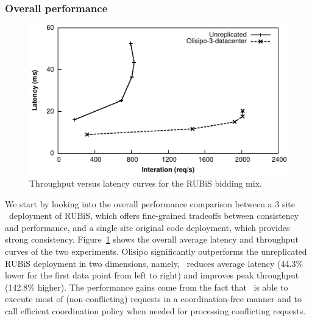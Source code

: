 \subsubsection{Overall performance}
\begin{figure}[t!]
  \centering
\includegraphics[width=0.85\columnwidth]{figures/por/eval/throughput_unreplicated_vs_por.pdf}
  \caption{Throughput versus latency curves for the RUBiS bidding mix.}
 \label{fig:por:thptunreplicatevspor}
\end{figure}

We start by looking into the overall performance comparison between a 3 site \coordtool\ deployment of
RUBiS, which offers fine-grained tradeoffs between consistency and performance, and a single site original code deployment,
which provides strong consistency. Figure~\ref{fig:por:thptunreplicatevspor} shows the overall average latency and throughput curves of the
two experiments. Olisipo significantly outperforms the unreplicated RUBiS deployment in two dimensions,
namely, \coordtool\ reduces average latency (44.3\% lower for the first data point from left to right) and improves peak throughput (142.8\% higher).
The performance gains come from the fact that \coordtool\ is able to execute most of (non-conflicting) requests 
in a coordination-free manner and to call efficient coordination policy when needed for processing conflicting requests.

